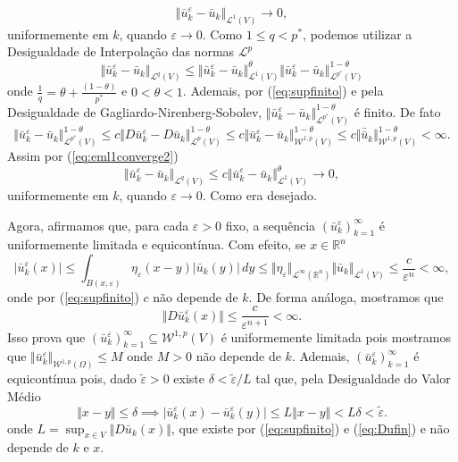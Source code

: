 \documentclass[a4paper, 11pt]{book}
\theoremstyle{definition}
\newcommand{\bR}{\mathbb{R}}
\newcommand{\cL}{\mathcal{L}}
\newcommand{\cW}{\mathcal{W}}
\begin{document}
\begin{prf}
\begin{equation}
        \Vert \bar u_k^\varepsilon - \bar u_k \Vert_{\cL^1 (V)} \to 0,
    \end{equation}
    uniformemente em $k$, quando $\varepsilon \to 0$. Como $1 \leqslant q < p^*$, podemos utilizar a Desigualdade de Interpolação das normas $\cL^p$
    \[
        \Vert \bar u_k^\varepsilon - \bar u_k \Vert_{\cL^q(V)} \leqslant \Vert \bar u_k^\varepsilon - \bar u_k \Vert_{\cL^1(V)}^\theta \Vert \bar u_k^\varepsilon - \bar u_k \Vert_{\cL^{p^*}(V)}^{1- \theta}
    \]
    onde $\frac{1}{q} = \theta + \frac{(1 - \theta)}{p^*}$ e $0 < \theta < 1$.
    Ademais, por (\ref{eq:supfinito}) e pela Desigualdade de Gagliardo-Nirenberg-Sobolev, $\Vert \bar u_k^\varepsilon - \bar u_k \Vert_{\cL^{p^*}(V)}^{1- \theta}$ é finito. De fato
    \[
        \Vert \bar u_k^\varepsilon - \bar u_k \Vert_{\cL^{p^*}(V)}^{1 - \theta} \leqslant c \Vert D\bar u_k^\varepsilon - D\bar u_k \Vert_{\cL^p(V)}^{1 - \theta} \leqslant c \Vert \bar u_k^\varepsilon - \bar u_k \Vert_{\cW^{1,p}(V)}^{1- \theta} \leqslant c \Vert \bar \bar u_k \Vert_{\cW^{1,p}(V)}^{1-\theta} < \infty. 
    \]
    Assim por (\ref{eq:eml1converge2})
    \[
        \Vert \bar u_k^\varepsilon - \bar u_k \Vert_{\cL^q(V)} \leqslant c \Vert \bar u_k^\varepsilon - \bar u_k \Vert_{\cL^1(V)}^\theta \to 0,
    \]
    uniformemente em $k$, quando $\varepsilon \to 0$. Como era desejado.

    Agora, afirmamos que, para cada $\varepsilon > 0$ fixo, a sequência $(\bar u_k^\varepsilon)_{k=1}^\infty$ é uniformemente limitada e equicontínua.
    Com efeito, se $x \in \bR^n$
    \begin{equation} \label{eq:ufin}
        |\bar u_k^\varepsilon(x)| \leqslant \int_{B(x,\varepsilon)} \eta_\varepsilon (x - y) |\bar u_k(y)| \,dy \leqslant \Vert \eta_\varepsilon \Vert_{\cL^\infty(\bR^n)} \Vert \bar u_k \Vert_{\cL^1(V)} \leqslant \frac{c}{\varepsilon^n} < \infty,
    \end{equation}
    onde por (\ref{eq:supfinito}) $c$ não depende de $k$. De forma análoga, mostramos que
    \begin{equation} \label{eq:Dufin}
        \Vert D\bar u_k^\varepsilon(x) \Vert  \leqslant \frac{c}{\varepsilon^{n+1}} < \infty.
    \end{equation}
    Isso prova que $(\bar u_k^\varepsilon)_{k=1}^\infty \subseteq \cW^{1,p}(V)$ é uniformemente limitada pois mostramos que $\Vert \bar u_k^\varepsilon \Vert_{\cW^{1,p}(\Omega)}\leqslant M$ onde $M > 0$ não depende de $k$.
    Ademais, $(\bar u_k^\varepsilon)_{k=1}^\infty$ é equicontínua pois, dado $\tilde\varepsilon > 0$ existe $\delta < \tilde\varepsilon / L$ tal que, pela Desigualdade do Valor Médio
    \[
        \Vert x - y \Vert \leqslant \delta \implies |\bar u_k^\varepsilon(x) - \bar u_k^\varepsilon(y)| \leqslant L \Vert x - y \Vert < L \delta < \tilde\varepsilon.
    \]
    onde $L = \sup_{x \in V} \Vert D\bar u_k(x) \Vert$, que existe por (\ref{eq:supfinito}) e (\ref{eq:Dufin}) e não depende de $k$ e $x$.


\end{prf}
\end{document}
